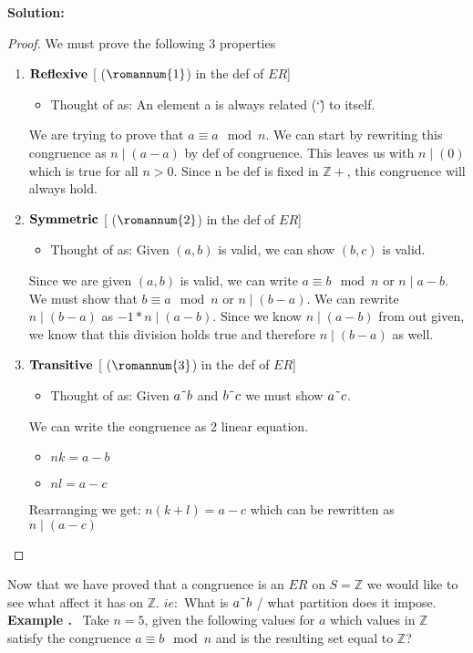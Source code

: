 \documentclass{article}
\newcounter{example}
\newcounter{solution}
\theoremstyle{claim}
\newcommand\Example{%
  \stepcounter{example}%
  \textbf{Example \theexample.}~%
  \setcounter{solution}{0}%
}
\newcommand\TheSolution{%
  \textbf{Solution:}\\%
}
\begin{document}
\TheSolution 
\begin{proof}{}
We must prove the following 3 properties
\begin{enumerate}
  \item $\bold{Reflexive}$ [ ($\romannum{1}$) in the def of $ER$]
  \begin{itemize}
     \item Thought of as: An element a is always related (\char`\~) to itself.
   \end{itemize}
   We are trying to prove that $a \equiv a \mod n$. We can start by rewriting this congruence as $n \mid (a-a)$ by def of congruence. This leaves us with $n \mid (0)$ which is true for all $n > 0$. Since n be def is fixed in $\mathbb{Z+}$, this congruence will always hold.
  \item $\bold{Symmetric}$ [ ($\romannum{2}$) in the def of $ER$]
    \begin{itemize}
     \item Thought of as: Given $(a, b)$ is valid, we can show $(b, c)$ is valid.
    \end{itemize}
   Since we are given $(a, b)$ is valid, we can write $a \equiv b \mod n$ or $n \mid a-b$. We must show that $b \equiv a \mod n$ or $n \mid (b-a)$.
   We can rewrite $n \mid (b-a)$ as $-1 * n \mid (a-b)$. Since we know $n \mid (a-b)$ from out given, we know that this division holds true and therefore $n \mid (b-a)$ as well. 
  \item $\bold{Transitive}$ [ ($\romannum{3}$) in the def of $ER$]
    \begin{itemize}
     \item Thought of as: Given $a \char`\~ b$ and $b \char`\~ c$ we must show $a \char`\~ c$.
   \end{itemize}
   We can write the congruence as 2 linear equation.
   \begin{itemize}
     \item $nk = a - b$
     \item $nl = a - c$
   \end{itemize}
   Rearranging we get: $n(k+l) = a - c$ which can be rewritten as $n \mid (a-c)$
\end{enumerate}
\end{proof}
Now that we have proved that a congruence is an $ER$ on $S = \mathbb{Z}$ we would like to see what affect it has on $\mathbb{Z}$. $ie:$ What is $a \char`\~ b$ / what partition does it impose.
\newline
\newline
\Example Take $n = 5$, given the following values for $a$ which values in $\mathbb{Z}$ satisfy the congruence $a \equiv b \mod n$ and is the resulting set equal to $\mathbb{Z}$?
\end{document}
